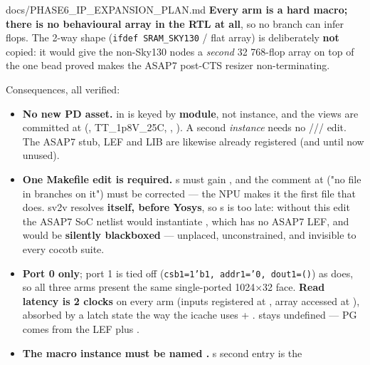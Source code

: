 \begin{relocated}{docs/PHASE6_IP_EXPANSION_PLAN.md}
\textbf{Every arm is a hard macro; there is no behavioural array in the
RTL at all}, so no branch can infer flops. The 
2-way shape (\texttt{ifdef\ SRAM\_\allowbreak{}SKY130} / 
flat array) is deliberately \textbf{not} copied: it would give the
non-Sky130 nodes a \emph{second} 32 768-flop array on top of the one
bead  proved makes the ASAP7 post-CTS resizer non-terminating.

Consequences, all verified:

\begin{itemize}
\tightlist
\item
  \textbf{No new PD asset.}  in
   is keyed by \textbf{module},
  not instance, and the views are committed at
   (, 
  TT\_\allowbreak{}1p8V\_\allowbreak{}25C, , ). A
  second \emph{instance} needs no
  ///
  edit. The ASAP7 stub, LEF and LIB are likewise already registered (and
  until now unused).
\item
  \textbf{One Makefile edit is required.}
  \textquotesingle s  must
  gain , and the comment at 
  ("no file in  branches on it") must be corrected
  --- the NPU makes it the first file that does. sv2v resolves
   \textbf{itself, before Yosys}, so
  \textquotesingle s  is too
  late: without this edit the ASAP7 SoC netlist would instantiate
  , which has no ASAP7 LEF, and would be
  \textbf{silently blackboxed} --- unplaced, unconstrained, and
  invisible to every cocotb suite.
\item
  \textbf{Port 0 only}; port 1 is tied off
  (\texttt{csb1=\allowbreak{}1'b1,\allowbreak{}\ addr1=\allowbreak{}'0,\allowbreak{}\ dout1=\allowbreak{}()})
  as  does, so all three arms present the
  same single-ported 1024×32 face. \textbf{Read latency is 2 clocks} on
  every arm (inputs registered at , array accessed at
  ), absorbed by a latch state the way the icache uses
   + .  stays
  undefined --- PG comes from the LEF plus .
\item
  \textbf{The macro instance must be named .}
  \textquotesingle s second entry is the

\end{itemize}
\end{relocated}
